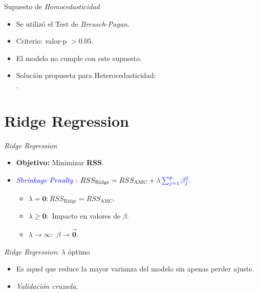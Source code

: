 \documentclass[11pt]{beamer}\usepackage{knitr}
\newcommand{\B}{\beta}
\begin{document}
\begin{frame}{Supuesto de \textit{Homocedasticidad}}
	\begin{itemize}
		\item Se utilizó el Test de \textit{Breusch-Pagan}.
		\pause
		\item Criterio: valor-p $>\mathbf{0.05}$.
		\pause
		\item El modelo no cumple con este supuesto.
		\pause
		\item Solución propuesta para Heterocedasticidad: \\ .
	\end{itemize}
\end{frame}





\section{Ridge Regression}

\begin{frame}{\textit{Ridge Regression}}
	\begin{itemize}
		\item \textbf{Objetivo:} Minimizar \textbf{RSS}.
		\pause
		\item \textcolor{blue}{\textit{Shrinkage Penalty}} : $RSS_{\text{Ridge}} = RSS_{\text{AMC}} + \textcolor{blue}{\lambda \sum^p_{j=1} \beta_j^2}$.
		\begin{itemize}
			\item $\lambda = \mathbf{0}: RSS_{\text{Ridge}} = RSS_{\text{AMC}}$.
			\item $\lambda \geq \mathbf{0}:$ Impacto en valores de $\B$.
			\item $\lambda \to \mathbf{\infty}:$ $\B \to \vec{\mathbf{0}}$.
		\end{itemize}
	\end{itemize}
\end{frame}

\begin{frame}{\textit{Ridge Regression}: $\lambda$ óptimo}
	\begin{itemize}
		\item Es aquel que reduce la mayor varianza del modelo sin apenas perder ajuste.
		\pause
		\item \textit{Validación cruzada}.
	\end{itemize}
\end{frame}
\end{document}

